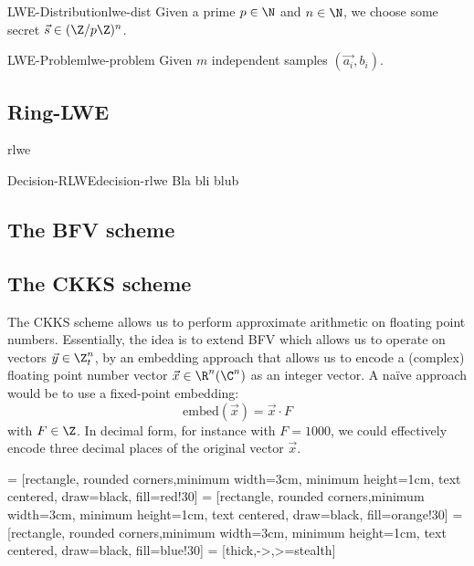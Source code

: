 \begin{definition}{LWE-Distribution}{lwe-dist}
  Given a prime $p \in \N$ and $n \in \N$, we choose some secret $\vec{s} \in (\Z / p \Z)^n$.
\end{definition}
\begin{definition}{LWE-Problem}{lwe-problem}
  Given $m$ independent samples $(\vec{a_i}, b_i)$.
\end{definition}

\subsection{Ring-LWE}
\Gls{rlwe}
\cite{2010-rlwe-original}

\begin{definition}{Decision-RLWE}{decision-rlwe}
  Bla bli blub
\end{definition}


\subsection{The BFV scheme}
\cite{2012-fv-original}
\cite{2012-brakerski}

\subsection{The CKKS scheme}
The CKKS scheme allows us to perform approximate arithmetic on floating point numbers.
Essentially, the idea is to extend BFV which allows us to operate on vectors $\vec{y} \in \Z_t^n$,
by an embedding approach that allows us to encode a (complex) floating point number vector $\vec{x} \in \R^n (\C^n)$
as an integer vector. A na\"ive approach would be to use a fixed-point embedding:
\newcommand{\embed}{\mathrm{embed}}
$$\embed(\vec{x}) = \vec{x} \cdot F$$
with $F \in \Z$. In decimal form, for instance with $F = 1000$, we could effectively encode
three decimal places of the original vector $\vec{x}$.

 = [rectangle, rounded corners,minimum width=3cm, minimum height=1cm, text centered, draw=black, fill=red!30]
 = [rectangle, rounded corners,minimum width=3cm, minimum height=1cm, text centered, draw=black, fill=orange!30]
 = [rectangle, rounded corners,minimum width=3cm, minimum height=1cm, text centered, draw=black, fill=blue!30]
 = [thick,->,>=stealth]

